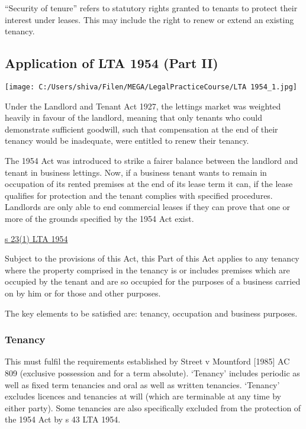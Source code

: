\documentclass[
]{article}
\newenvironment{env-2aad614f-6fd6-4025-876c-fcdbeae766fb}
{
    \savenotes\tcolorbox[blanker,breakable,left=5pt,borderline west={2pt}{-4pt}{green}]
}
{
    \endtcolorbox\spewnotes
}
\begin{document}
``Security of tenure'' refers to statutory rights granted to tenants to
protect their interest under leases. This may include the right to renew
or extend an existing tenancy.

\hypertarget{application-of-lta-1954-part-ii}{%
\subsection{Application of LTA 1954 (Part
II)}\label{application-of-lta-1954-part-ii}}

\texttt{[image: C:/Users/shiva/Filen/MEGA/LegalPracticeCourse/LTA 1954\_1.jpg]}

Under the Landlord and Tenant Act 1927, the lettings market was weighted
heavily in favour of the landlord, meaning that only tenants who could
demonstrate sufficient goodwill, such that compensation at the end of
their tenancy would be inadequate, were entitled to renew their tenancy.

The 1954 Act was introduced to strike a fairer balance between the
landlord and tenant in business lettings. Now, if a business tenant
wants to remain in occupation of its rented premises at the end of its
lease term it can, if the lease qualifies for protection and the tenant
complies with specified procedures. Landlords are only able to end
commercial leases if they can prove that one or more of the grounds
specified by the 1954 Act exist.

\begin{env-2aad614f-6fd6-4025-876c-fcdbeae766fb}

\href{https://www.legislation.gov.uk/ukpga/Eliz2/2-3/56/section/23}{s
23(1) LTA 1954}

Subject to the provisions of this Act, this Part of this Act applies to
any tenancy where the property comprised in the tenancy is or includes
premises which are occupied by the tenant and are so occupied for the
purposes of a business carried on by him or for those and other
purposes.

\end{env-2aad614f-6fd6-4025-876c-fcdbeae766fb}

The key elements to be satisfied are: tenancy, occupation and business
purposes.

\hypertarget{tenancy}{%
\subsubsection{Tenancy}\label{tenancy}}

This must fulfil the requirements established by Street v Mountford
{[}1985{]} AC 809 (exclusive possession and for a term absolute).
`Tenancy' includes periodic as well as fixed term tenancies and oral as
well as written tenancies. `Tenancy' excludes licences and tenancies at
will (which are terminable at any time by either party). Some tenancies
are also specifically excluded from the protection of the 1954 Act by s
43 LTA 1954.
\end{document}
